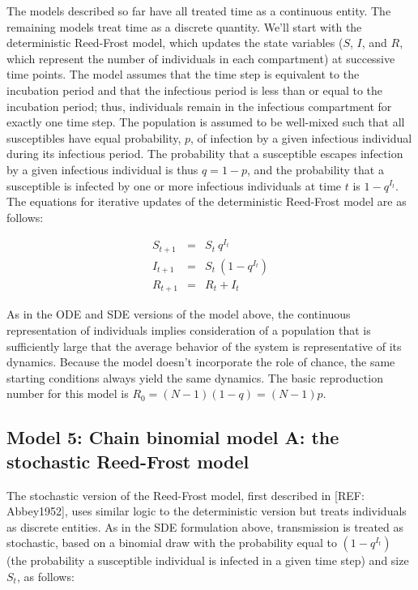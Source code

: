 \documentclass[margin,line,11pt]{article}
\begin{document}
The models described so far have all treated time as a continuous entity. The remaining models treat time as a discrete quantity. We'll start with the deterministic Reed-Frost model, which updates the state variables ($S$, $I$, and $R$, which represent the number of individuals in each compartment) at successive time points. The model assumes that the time step is equivalent to the incubation period and that the infectious period is less than or equal to the incubation period; thus, individuals remain in the infectious compartment for exactly one time step. The population is assumed to be well-mixed such that all susceptibles have equal probability, $p$, of infection by a given infectious individual during its infectious period. The probability that a susceptible escapes infection by a given infectious individual is thus $q = 1-p$, and the probability that a susceptible is infected by one or more infectious individuals  at time $t$ is $1-q^{I_t}$. The equations for iterative updates of the deterministic Reed-Frost model are as follows:

\begin{eqnarray*}
S_{t+1} &=& S_t\ q^{I_t} \\
I_{t+1} &=& S_t\ (1-q^{I_t}) \\
R_{t+1} &=& R_t + I_t
\end{eqnarray*}

\noindent As in the ODE and SDE versions of the model above, the continuous representation of individuals implies consideration of a population that is sufficiently large that the average behavior of the system is representative of its dynamics. Because the model doesn't incorporate the role of chance, the same starting conditions always yield the same dynamics. The basic reproduction number for this model is $R_0 = (N-1)(1-q) = (N-1)p$. %

\subsection{Model 5: Chain binomial model A: the stochastic Reed-Frost model}

The stochastic version of the Reed-Frost model, first described in [REF: Abbey1952], uses similar logic to the deterministic version but treats individuals as discrete entities. As in the SDE formulation above, transmission is treated as stochastic, based on a binomial draw with the probability equal to $(1-q^{I_t})$ (the probability a susceptible individual is infected in a given time step) and size $S_t$, as follows:
\end{document}

